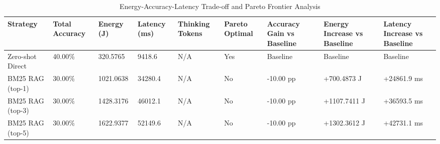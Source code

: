 \begin{table}
\caption{Energy-Accuracy-Latency Trade-off and Pareto Frontier Analysis}
\label{tab:tradeoff_comparison}
\begin{tabular}{lllllllll}
\toprule
Strategy & Total Accuracy & Energy (J) & Latency (ms) & Thinking Tokens & Pareto Optimal & Accuracy Gain vs Baseline & Energy Increase vs Baseline & Latency Increase vs Baseline \\
\midrule
Zero-shot Direct & 40.00\% & 320.5765 & 9418.6 & N/A & Yes & Baseline & Baseline & Baseline \\
BM25 RAG (top-1) & 30.00\% & 1021.0638 & 34280.4 & N/A & No & -10.00 pp & +700.4873 J & +24861.9 ms \\
BM25 RAG (top-3) & 30.00\% & 1428.3176 & 46012.1 & N/A & No & -10.00 pp & +1107.7411 J & +36593.5 ms \\
BM25 RAG (top-5) & 30.00\% & 1622.9377 & 52149.6 & N/A & No & -10.00 pp & +1302.3612 J & +42731.1 ms \\
\bottomrule
\end{tabular}
\end{table}
